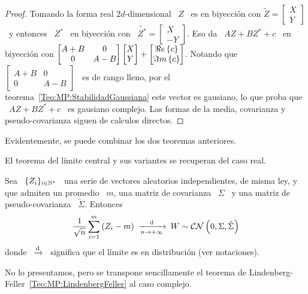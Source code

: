 \begin{proof}
  Tomando  la  forma  real  $2d$-dimensional  \  $Z$ \  es  en  biyecci\'on  con
  $\widetilde{Z} = \begin{bmatrix} X\\Y \end{bmatrix}$ \ y entonces \ $Z^*$ \ en
  biyecci\'on con \ $\widetilde{Z^*} = \begin{bmatrix} X\\-Y \end{bmatrix}$. Eso
  da \ $A  Z + B Z^*  + c$ \ en biyecci\'on  con $\begin{bmatrix} A+B &  0\\ 0 &
    A-B  \end{bmatrix}  \begin{bmatrix}  X\\Y  \end{bmatrix}  +  \begin{bmatrix}
    \Re e \left\{ c \right\}\\ \Im m \left\{ c \right\} \end{bmatrix}$. Notando que \ $\begin{bmatrix} A+B & 0\\
    0    &   A-B    \end{bmatrix}$   \    es    de   rango    lleno,   por    el
  teorema~\ref{Teo:MP:StabilidadGaussiana} este vector es gausiano, lo que proba
  que \  $A Z  + B  Z^* + c$  \ es  gausiano complejo. Las  formas de  la media,
  covarianza y pseudo-covarianza siguen de calculos directos.
\end{proof}
%
Evidentemente, se puede combinar los dos teoremas anteriores.

El teorema del l\'imite central y sus variantes se recuperan del caso real.
%
\begin{teorema}
\label{Teo:MP:CLTComplejo}
%
  Sea  \  $\{  Z_i \}_{i  \in  \mathbb{N}^*}$  \  una  serie de  vectores  aleatorios
  independientes, de misma  ley, y que admiten un promedio \  $m$, una matriz de
  covarianza   \   $\Sigma$   \    y   una   matriz   de   pseudo-covarianza   \
  $\check{\Sigma}$. Entonces
  \[
  \frac{1}{\sqrt{n}}  \sum_{i=1}^m  \left( Z_i  -  m  \right)  \: \xrightarrow[n  \to
    +\infty]{\mathrm{d}} \: W \sim \mathcal{C}\mathcal{N}\left( 0 , \Sigma , \check{\Sigma} \right)
  \]
  donde  \ $\xrightarrow[]{\mathrm{d}}$ \  significa que  el l\'imite  es en  distribuci\'on (ver
  notaciones).
\end{teorema}
%
No   lo   presentamos,  pero   se   transpone   sencillamente   el  teorema   de
Lindenberg-Feller~\ref{Teo:MP:LindenbergFeller} al caso complejo.

